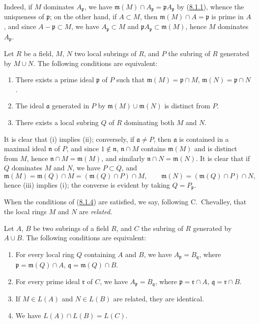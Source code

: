Indeed, if $M$ dominates $A_\mathfrak p$, we have
$\mathfrak m(M)\cap A_\mathfrak p=\mathfrak p A_\mathfrak p$ by
(\hyperref[I.8.1.1]{8.1.1}), whence the uniqueness of $\mathfrak p$; on
the other hand, if $A\subset M$, then $\mathfrak m(M)\cap A=\mathfrak p$ is
prime in $A$, and since $A-\mathfrak p\subset M$, we have
$A_\mathfrak p\subset M$ and
$\mathfrak p A_\mathfrak p\subset\mathfrak m(M)$, hence $M$ dominates
$A_\mathfrak p$.

\begin{lemma}[8.1.4]
\label{I.8.1.4}
Let $R$ be a field, $M$, $N$ two local subrings of $R$, and $P$ the subring of
$R$ generated by $M\cup N$. The following conditions are equivalent:
\begin{enumerate}
  \item[(i)] There exists a prime ideal $\mathfrak p$ of $P$ such that
    $\mathfrak m(M)=\mathfrak p\cap M$,
    $\mathfrak m(N)=\mathfrak p\cap N$.
  \item[(ii)] The ideal $\mathfrak a$ generated in $P$ by
    $\mathfrak m(M)\cup\mathfrak m(N)$ is distinct from $P$.
  \item[(iii)] There exists a local subring $Q$ of $R$ dominating both $M$
    and $N$.
\end{enumerate}
\end{lemma}

It is clear that (i) implies (ii); conversely, if $\mathfrak a\ne P$, then
$\mathfrak a$ is contained in a maximal ideal $\mathfrak n$ of $P$, and since
$1\notin\mathfrak n$, $\mathfrak n\cap M$ contains $\mathfrak m(M)$ and is
distinct from $M$, hence $\mathfrak n\cap M=\mathfrak m(M)$, and similarly
$\mathfrak n\cap N=\mathfrak m(N)$. It is clear that if $Q$ dominates $M$ and
$N$, we have $P\subset Q$, and
\[
  \mathfrak m(M)=\mathfrak m(Q)\cap M
  =(\mathfrak m(Q)\cap P)\cap M,\qquad
  \mathfrak m(N)=(\mathfrak m(Q)\cap P)\cap N,
\]
hence (iii) implies (i); the converse is evident by taking
$Q=P_\mathfrak p$.

When the conditions of (\hyperref[I.8.1.4]{8.1.4}) are satisfied, we say,
following C.~Chevalley, that the local rings $M$ and $N$ are
\emph{related}.

\begin{proposition}[8.1.5]
\label{I.8.1.5}
Let $A$, $B$ be two subrings of a field $R$, and $C$ the subring of $R$
generated by $A\cup B$. The following conditions are equivalent:
\begin{enumerate}
  \item[(i)] For every local ring $Q$ containing $A$ and $B$, we have
    $A_\mathfrak p=B_\mathfrak q$, where
    $\mathfrak p=\mathfrak m(Q)\cap A$,
    $\mathfrak q=\mathfrak m(Q)\cap B$.
  \item[(ii)] For every prime ideal $\mathfrak r$ of $C$, we have
    $A_\mathfrak p=B_\mathfrak q$, where
    $\mathfrak p=\mathfrak r\cap A$, $\mathfrak q=\mathfrak r\cap B$.
  \item[(iii)] If $M\in L(A)$ and $N\in L(B)$ are related, they are
    identical.
  \item[(iv)] We have $L(A)\cap L(B)=L(C)$.
\end{enumerate}
\end{proposition}

